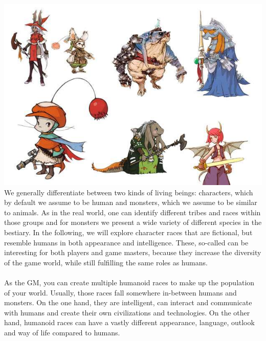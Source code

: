 %
\\
%
\vfill
%
\includegraphics[width=\columnwidth]{./art/races/races.jpg}
%
\vfill
%
We generally differentiate between two kinds of living beings: characters, which by default we assume to be human and monsters, which we assume to be similar to animals.
As in the real world, one can identify different tribes and races within those groups and for monsters we present a wide variety of different species in the bestiary.
In the following, we will explore character races that are fictional, but resemble humans in both appearance and intelligence.
These, so-called  can be interesting for both players and game masters, because they increase the diversity of the game world, while still fulfilling the same roles as humans. 
%
\vfill
%
\\\\
%
As the GM, you can create multiple humanoid races to make up the population of your world.
Usually, those races fall somewhere in-between humans and monsters.
On the one hand, they are intelligent, can interact and communicate with humans and create their own civilizations and technologies.
On the other hand, humanoid races can have a vastly different appearance, language, outlook and way of life compared to humans.  
